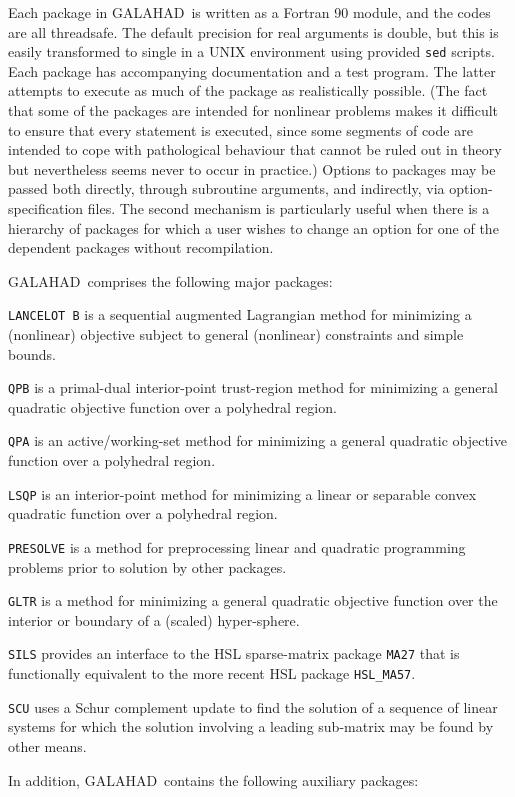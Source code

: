 \documentclass[twoside]{article}
\newcommand{\gal}{{\sf GALAHAD}}
\renewcommand{\itt}[1]{\item{{\tt #1}}}
\begin{document}
Each package in \gal\ is written as a Fortran 90 module, and the codes
are all threadsafe. The default
precision for real arguments is double, but this is easily transformed
to single in a UNIX environment using provided {\tt sed} scripts.
Each package has accompanying
documentation and a test program. The latter attempts to execute as
much of the package as
realistically possible. (The fact that some of the packages are
intended for nonlinear problems makes it difficult to ensure that
every statement is executed, since some segments of code are
intended to cope with pathological behaviour that cannot be ruled out
in theory but nevertheless seems never to occur in practice.)
Options to packages may be passed both directly, through subroutine arguments,
and indirectly, via option-specification files. The second mechanism is
particularly useful when there is a hierarchy of packages for which
a user wishes to change an option for one of the dependent packages without
recompilation.


\gal\ comprises the following major packages:

\begin{description}

\itt{LANCELOT B} is a sequential augmented Lagrangian method for
minimizing a (nonlinear) objective subject to general (nonlinear) constraints
and simple bounds.

\itt{QPB} is a primal-dual interior-point trust-region method for
minimizing a general quadratic objective function over a polyhedral region.

\itt{QPA} is an active/working-set method for
minimizing a general quadratic objective function over a polyhedral region.

\itt{LSQP} is an interior-point method for minimizing a linear or
separable convex quadratic function over a polyhedral region.

\itt{PRESOLVE} is a method for preprocessing linear and quadratic programming
problems prior to solution by other packages.

\itt{GLTR} is a method for minimizing a general quadratic objective function
over the interior or boundary of a (scaled) hyper-sphere.

\itt{SILS} provides an interface to the HSL sparse-matrix package {\tt MA27}
that is functionally equivalent to the more recent HSL package {\tt HSL\_MA57}.

\itt{SCU} uses a Schur complement update to find the solution of
a sequence of linear systems for which the solution
involving a leading sub-matrix may be found by other means.

\end{description}
In addition, \gal\ contains the following auxiliary packages:
\end{document}
